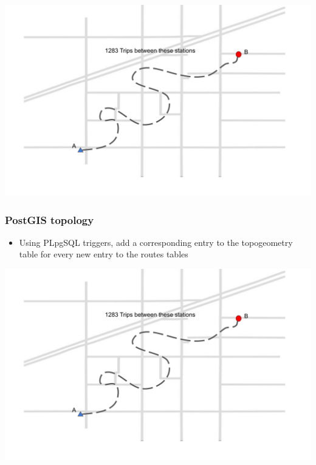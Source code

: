 \documentclass{beamer}
\begin{document}
\begin{frame}
    \includegraphics[width=\textwidth,page=6]{graphics_document.pdf}
\end{frame}
\begin{frame}
    \frametitle{PostGIS topology}
    \begin{itemize}
        \item Using PLpgSQL triggers, add a corresponding entry to the topogeometry table for every new entry to the routes tables
    \end{itemize}
\end{frame}

\begin{frame}
    \includegraphics[width=\textwidth,page=7]{graphics_document.pdf}
\end{frame}
\end{document}
